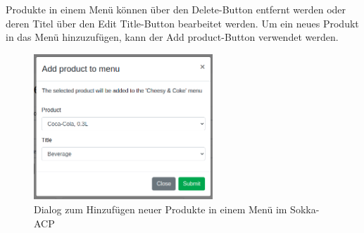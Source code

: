 Produkte in einem Menü können über den \glqq Delete\grqq -Button entfernt werden oder deren Titel über den \glqq Edit Title\grqq -Button bearbeitet werden. Um ein neues Produkt in das Menü hinzuzufügen, kann der \glqq Add product\grqq -Button verwendet werden.

\begin{figure}[ht]
    \centering
    \includegraphics[width=0.6\textwidth]{images/ACP/menus_add_product.png}
    \caption{Dialog zum Hinzufügen neuer Produkte in einem Menü im Sokka-ACP}
\end{figure}